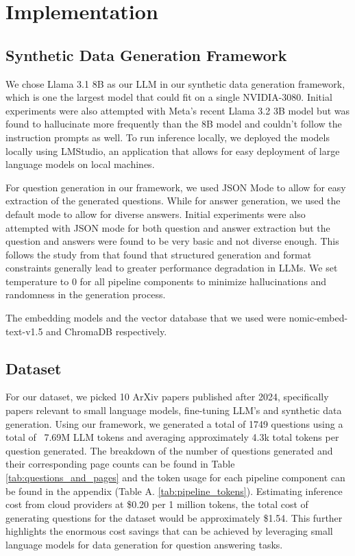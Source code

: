 \section{Implementation}\label{sec:implementation}


\subsection{Synthetic Data Generation Framework}

We chose Llama 3.1 8B as our LLM in our synthetic data generation framework, which is one the largest model that could fit on a single NVIDIA-3080. Initial experiments
were also attempted with Meta's recent Llama 3.2 3B model \cite{llama32} but was found to hallucinate more frequently than the 8B model and couldn't follow the instruction prompts as well.
To run inference locally, we deployed the models locally using LMStudio, an application that allows for easy deployment of large language models on local machines.

For question generation in our framework, we used JSON Mode to allow for easy extraction of the generated questions. While for answer generation, we used the default
mode to allow for diverse answers. Initial experiments were also attempted with JSON mode for both question and answer extraction but the question and answers
were found to be very basic and not diverse enough. This follows the study from \cite{tam2024letspeakfreelystudy} that found that structured generation and format constraints
generally lead to greater performance degradation in LLMs. We set temperature to 0 for all pipeline components to minimize hallucinations and randomness in the generation process.

The embedding models and the vector database that we used were nomic-embed-text-v1.5 and ChromaDB respectively.

\subsection{Dataset}

For our dataset, we picked 10 ArXiv papers published after 2024, specifically papers relevant to small language models, fine-tuning LLM's and synthetic data generation.
Using our framework, we generated a total of 1749 questions using a total of ~7.69M LLM tokens and averaging approximately 4.3k total tokens per question generated.
The breakdown of the number of questions generated and their corresponding page counts can be found in Table \ref{tab:questions_and_pages} and the token usage
for each pipeline component can be found in the appendix (Table A. \ref{tab:pipeline_tokens}). Estimating inference cost from cloud providers at \$0.20 per 1 million tokens,
the total cost of generating questions for the dataset would be approximately \$1.54. This further highlights the enormous cost savings that can be achieved
by leveraging small language models for data generation for question answering tasks.

